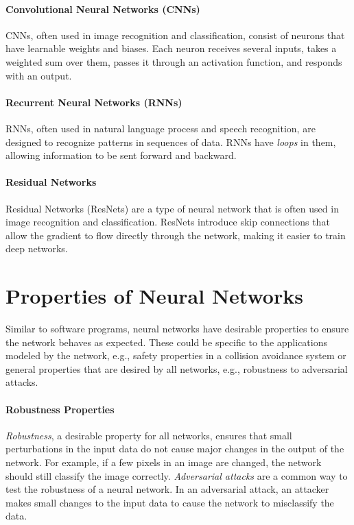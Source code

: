 \documentclass[oneside,11pt,dvipsnames]{book}
\begin{document}
\paragraph{Convolutional Neural Networks (CNNs)} CNNs, often used in image recognition and classification, consist of neurons that have learnable weights and biases. Each neuron receives several inputs, takes a weighted sum over them, passes it through an activation function, and responds with an output.

\paragraph{Recurrent Neural Networks (RNNs)} RNNs, often used in natural language process and speech recognition, are designed to recognize patterns in sequences of data. RNNs have \emph{loops} in them, allowing information to be sent forward and backward.

\paragraph{Residual Networks} Residual Networks (ResNets) are a type of neural network that is often used in image recognition and classification. ResNets introduce skip connections that allow the gradient to flow directly through the network, making it easier to train deep networks.

\section{Properties of Neural Networks}
Similar to software programs, neural networks have desirable properties to ensure the network behaves as expected. These could be specific to the applications modeled by the network, e.g., safety properties in a collision avoidance system or general properties that are desired by all networks, e.g., robustness to adversarial attacks. 


\paragraph{Robustness Properties}
\emph{Robustness}, a desirable property for all networks, ensures that small perturbations in the input data do not cause major changes in the output of the network. For example, if a few pixels in an image are changed, the network should still classify the image correctly. \emph{Adversarial attacks} are a common way to test the robustness of a neural network. In an adversarial attack, an attacker makes small changes to the input data to cause the network to misclassify the data.
\end{document}

